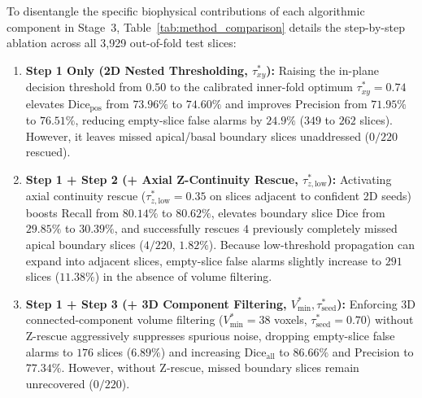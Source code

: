 \documentclass[preprint,12pt,authoryear]{elsarticle}
\begin{document}
To disentangle the specific biophysical contributions of each algorithmic component in Stage~3, Table~\ref{tab:method_comparison} details the step-by-step ablation across all 3,929 out-of-fold test slices:
\begin{enumerate}
\item \textbf{Step 1 Only (2D Nested Thresholding, $\tau_{xy}^*$):} Raising the in-plane decision threshold from $0.50$ to the calibrated inner-fold optimum $\tau_{xy}^* = 0.74$ elevates $\text{Dice}_{\text{pos}}$ from $73.96\%$ to $74.60\%$ and improves Precision from $71.95\%$ to $76.51\%$, reducing empty-slice false alarms by $24.9\%$ ($349$ to $262$ slices). However, it leaves missed apical/basal boundary slices unaddressed ($0 / 220$ rescued).
\item \textbf{Step 1 + Step 2 (+ Axial Z-Continuity Rescue, $\tau_{z,\mathrm{low}}^*$):} Activating axial continuity rescue ($\tau_{z,\mathrm{low}}^* = 0.35$ on slices adjacent to confident 2D seeds) boosts Recall from $80.14\%$ to $80.62\%$, elevates boundary slice Dice from $29.85\%$ to $30.39\%$, and successfully rescues $4$ previously completely missed apical boundary slices ($4 / 220$, $1.82\%$). Because low-threshold propagation can expand into adjacent slices, empty-slice false alarms slightly increase to $291$ slices ($11.38\%$) in the absence of volume filtering.
\item \textbf{Step 1 + Step 3 (+ 3D Component Filtering, $V_{\min}^*, \tau_{\mathrm{seed}}^*$):} Enforcing 3D connected-component volume filtering ($V_{\min}^* = 38$ voxels, $\tau_{\mathrm{seed}}^* = 0.70$) without Z-rescue aggressively suppresses spurious noise, dropping empty-slice false alarms to $176$ slices ($6.89\%$) and increasing $\text{Dice}_{\text{all}}$ to $86.66\%$ and Precision to $77.34\%$. However, without Z-rescue, missed boundary slices remain unrecovered ($0 / 220$).

\end{enumerate}
\end{document}
